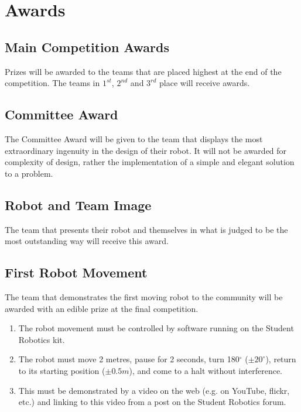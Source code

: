 \section {Awards}
\label{sec:Awards}

\subsection{Main Competition Awards}
Prizes will be awarded to the teams that are placed highest at the end of the competition.
The teams in $1^{st}$, $2^{nd}$ and $3^{rd}$ place will receive awards.

\subsection{Committee Award}
The Committee Award will be given to the team that displays the most extraordinary ingenuity in the design of their robot.
It will not be awarded for complexity of design, rather the implementation of a simple and elegant solution to a problem.

\subsection{Robot and Team Image}
The team that presents their robot and themselves in what is judged to be the most outstanding way will receive this award.

\subsection{First Robot Movement}
The team that demonstrates the first moving robot to the community will be awarded with an edible prize at the final competition.
\begin{enumerate}
\item The robot movement must be controlled by software running on the Student Robotics kit.
\item The robot must move 2 metres, pause for 2 seconds, turn 180$^\circ$ ($\pm20^\circ$), return to its starting position ($\pm0.5m$), and come to a halt without interference.
\item This must be demonstrated by a video on the web (e.g. on YouTube, flickr, etc.) and linking to this video from a post on the Student Robotics forum.
\end{enumerate}


